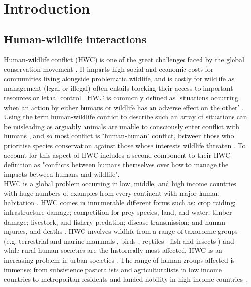 \section{Introduction}

\subsection{Human-wildlife interactions}

Human-wildlife conflict (HWC) is one of the great challenges faced by the global conservation movement \cite{Dickman2010b,Redpath2013}. It imparts high social and economic costs for communities living alongside problematic wildlife, and is costly for wildlife as management (legal or illegal) often entails blocking their access to important resources or lethal control \cite{Dickman2010b,Woodroffe2005}. HWC is commonly defined as 'situations occurring when an action by either humans or wildlife has an adverse effect on the other' \cite{Conover2010a}. Using the term human-wildlife conflict to describe such an array of situations can be misleading as arguably animals are unable to consciously enter conflict with humans \cite{Peterson2010b,Redpath2014b}, and so most conflict is "human-human" conflict, between those who prioritise species conservation against those whose interests wildlife threaten \cite{Peterson2010b,Redpath2014b}. To account for this aspect of HWC \citet{Kansky2016} includes a second component to their HWC definition as "conflicts between humans themselves over how to manage the impacts between humans and wildlife".\\

HWC is a global problem occurring in low, middle, and high income countries \cite{Manfredo2004} with huge numbers of examples from every continent with major human habitation \cite{Dickman2014d,Musiani2005,Palmeira2008,Bagchi2006,Prowse2014,Thirgood2016}. HWC comes in innumerable different forms such as: crop raiding; infrastructure damage; competition for prey species, land, and water; timber damage; livestock, and fishery predation; disease transmission; and human-injuries, and deaths \cite{Arlet2007b,Messmer2000,Conover1997a,woodroffe2005people,Thirgood2005}. HWC involves wildlife from a range of taxonomic groups (e.g. terrestrial and marine mammals \cite{Loe2004a,Butler2015}, birds \cite{Redpath1997}, reptiles \cite{Chaves2015}, fish \cite{Freitas2016} and insects \cite{Cease2015}) and while rural human societies are the historically most affected, HWC is an increasing problem in urban societies \cite{Messmer2000}. The range of human groups affected is immense; from subsistence pastoralists \cite{Dickman2014d} and agriculturalists \cite{Arlet2007b} in low income countries to metropolitan residents \cite{Conover1997a} and landed nobility in high income countries \cite{Redpath1997}.\\

